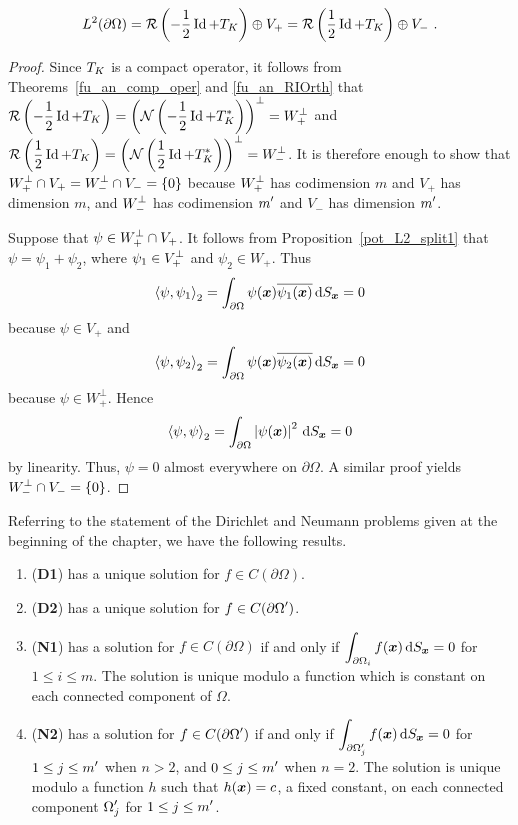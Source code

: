 \begin{cor} \label{pot_cor_splitL2}
\[
L^2(\partial \Omega) = \IMG \left( -\frac{1}{2} \Id + T_K\right)
\oplus V_+ = \IMG \left( \frac{1}{2} \Id + T_K\right) \oplus V_- \ .
\]
\end{cor}

\begin{proof}
Since $\displaystyle T_K$ is a compact operator, it
follows from Theorems~\ref{fu_an_comp_oper} and \ref{fu_an_RIOrth} that\\
$\displaystyle  \mathcal{R} \left(-\frac{1}{2} \operatorname{Id} + T_K\right)
= \left( \mathcal{N} \left(-\frac{1}{2} \operatorname{Id} + T_K^\ast \right) \right)^\perp
= W_+^\perp$
and \\
$\displaystyle \mathcal{R} \left(\frac{1}{2} \operatorname{Id} + T_K\right)
= \left( \mathcal{N} \left(\frac{1}{2} \operatorname{Id} + T_K^\ast \right) \right)^\perp
= W_-^\perp$.
It is therefore enough to show that
$\displaystyle W_+^\perp \cap V_+ = W_-^\perp \cap V_- = \{0\}$
because $\displaystyle W_+^\perp$ has codimension $m$ and $V_+$ has
dimension $m$, and $\displaystyle W_-^\perp$ has codimension
$\displaystyle m^{\prime}$ and $V_-$ has dimension $\displaystyle m^{\prime}$.

Suppose that $\displaystyle \psi \in W^\perp_+ \cap V_+$.  It follows from
Proposition~\ref{pot_L2_split1} that $\psi = \psi_1+\psi_2$, where
$\displaystyle \psi_1 \in V^\perp_+$ and $\psi_2 \in W_+$.  Thus
\[
\left\langle{\psi} , {\psi_1}\right\rangle_2 = \int_{\partial \Omega}
\psi({\bm{x}})\overline{\psi_1({\bm{x}})} \,\mathrm{d}{S}_{{\bm{x}}} = 0
\]
because $\psi \in V_+$ and
\[
\left\langle{\psi} , {\psi_2}\right\rangle_2 = \int_{\partial \Omega}
\psi({\bm{x}})\overline{\psi_2({\bm{x}})} \,\mathrm{d}{S}_{{\bm{x}}} = 0
\]
because $\psi \in W_+^\perp$.  Hence
\[
\left\langle{\psi} , {\psi}\right\rangle_2 = \int_{\partial \Omega}
\left| \psi({\bm{x}}) \right|^2 \,\mathrm{d}{S}_{{\bm{x}}} = 0
\]
by linearity.  Thus, $\psi=0$ almost everywhere on $\partial \Omega$.
A similar proof yields $\displaystyle W_-^\perp \cap V_- = \{0\}$.
\end{proof}

\begin{theorem} \label{pot_exist_uniqu_TH}
Referring to the statement of the Dirichlet and Neumann problems given
at the beginning of the chapter, we have the following results.
\begin{enumerate}
\item ({\bfseries D1}) has a unique solution for $f \in  C(\partial \Omega)$.
\item ({\bfseries D2}) has a unique solution for
$\displaystyle f \in  C(\partial \Omega^{\prime})$.
\item ({\bfseries N1}) has a solution for $f \in  C(\partial \Omega)$
if and only if
$\displaystyle \int_{\partial \Omega_i} f({\bm{x}})\,\mathrm{d}{S}_{{\bm{x}}}=0$
for $1 \leq i \leq m$.  The solution is unique modulo a
function which is constant on each connected component of $\Omega$.
\item ({\bfseries N2}) has a solution for
$\displaystyle f \in  C(\partial \Omega^{\prime})$ if and only if
$\displaystyle \int_{\partial \Omega_j^{\prime}} f({\bm{x}})\,\mathrm{d}{S}_{{\bm{x}}}=0$
for $\displaystyle 1\leq j \leq m^{\prime}$ when $n>2$, and
$\displaystyle 0\leq j \leq m^{\prime}$ when $n=2$.  The solution is
unique modulo a function $h$ such that $h({\bm{x}}) = c$, a fixed
constant, on each connected component
$\displaystyle \Omega_j^{\prime}$ for $\displaystyle 1\leq j \leq m^{\prime}$.
\end{enumerate}
\end{theorem}

